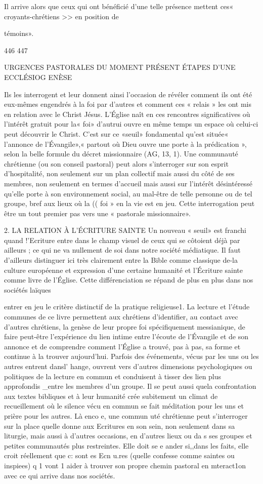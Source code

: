 Il arrive alors que ceux qui ont bénéficié d'une telle présence mettent ces« croyants-chrétiens >> en position de {{ témoins».
 

446	447
 
URGENCES PASTORALES DU MOMENT PRÉSENT	ÉTAPES D'UNE ECCLÉSIOG ENÈSE

 
Ils les interrogent et leur donnent ainsi l'occasion de révéler comment ils ont été eux-mêmes engendrés à la foi par d'autres et comment ces « relais » les ont mis en relation avec le Christ Jésus. L'Église naît en ces rencontres significatives où l'intérêt gratuit pour la« foi» d'autrui ouvre en même temps un espace où celui-ci peut découvrir le Christ. C'est sur ce «seuil» fondamental qu'est située« l'annonce de l'Évangile»,« partout où Dieu ouvre une porte à la prédication », selon la belle formule du décret missionnaire (AG, 13, 1).
Une communauté chrétienne (ou son conseil pastoral) peut
alors s'interroger sur son esprit d'hospitalité, non seulement sur un plan collectif mais aussi du côté de ses membres, non seulement en termes d'accueil mais aussi sur l'intérêt désintéressé qu'elle porte à son environnement social, au mal-être de telle personne ou de tel groupe, bref aux lieux où la (( foi » en la vie est en jeu. Cette interrogation peut être un tout premier pas vers une « pastorale missionnaire».

2.	LA RELATION À L'ÉCRITURE SAINTE
Un nouveau « seuil» est franchi quand !'Ecriture entre dans le champ visuel de ceux qui se côtoient déjà par ailleurs ; ce qui ne va nullement de soi dans notre société médiatique. Il faut d'ailleurs distinguer ici très clairement entre la Bible comme classique de-la culture européenne et expression d'une certaine humanité et l'Écriture sainte comme livre de l'Église. Cette différenciation se répand de plus en plus dans nos sociétés laïques
 
entrer en jeu le critère distinctif de la pratique religieuse1. La lecture et l'étude communes de ce livre permettent aux chrétiens d'identifier, au contact avec d'autres chrétiens, la genèse de leur propre foi spécifiquement messianique, de faire peut-être l'expérience du lien intime entre l'écoute de l'Évangile et de son annonce et de comprendre comment l'Église a trouvé, pas à pas, sa forme et continue à la trouver aujourd'hui.
Parfois des événements, vécus par les uns ou les autres entrent dansl' hange, ouvrent vers d'autres dimensions psychologiques ou politiques de la lecture en commun et conduisent à tisser des lien plus approfondis _entre les membres d'un groupe. Il se peut aussi quela confrontation aux textes bibliques et à leur humanité crée subitement un climat de recueillement où le silence vécu en commun se fait méditation pour les uns et prière pour les autres.
Là enco e, une commun uté chrétienne peut s'interroger sur la place quelle donne aux Ecritures en son sein, non seulement dans sa liturgie, mais aussi à d'autres occasions, en d'autres lieux ou da s ses groupes et petites communautés plus restreintes. Elle doit se e ander si,,dans les faits, elle croit réellement que c: sont es Ecn u.res (quelle confesse comme saintes ou inspiees) q 1 vont 1 aider à trouver son propre chemin pastoral en mteract1on avec ce qui arrive dans nos sociétés.
 
}}
